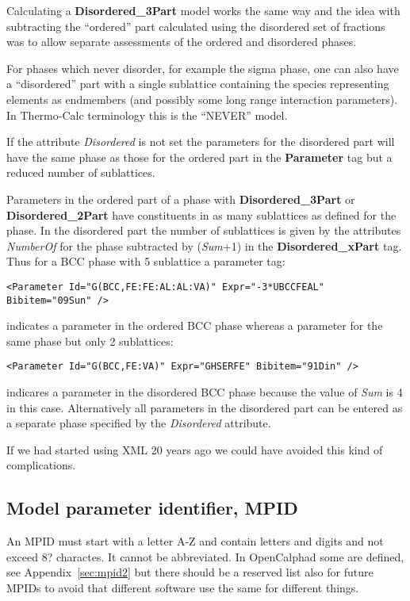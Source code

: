 \documentclass{article}
\begin{document}
Calculating a {\bf Disordered\_3Part} model works the same way and the
idea with subtracting the ``ordered'' part calculated using the
disordered set of fractions was to allow separate assessments of the
ordered and disordered phases.

For phases which never disorder, for example the sigma phase, one can
also have a ``disordered'' part with a single sublattice containing
the species representing elements as endmembers (and possibly some
long range interaction parameters).  In Thermo-Calc terminology this
is the ``NEVER'' model.

If the attribute {\em Disordered} is not set the parameters for the
disordered part will have the same phase as those for the ordered part
in the {\bf Parameter} tag but a reduced number of sublattices.

Parameters in the ordered part of a phase with {\bf Disordered\_3Part}
or {\bf Disordered\_2Part} have constituents in as many sublattices as
defined for the phase.  In the disordered part the number of
sublattices is given by the attributes {\em NumberOf} for the phase
subtracted by ({\em Sum}+1) in the {\bf Disordered\_xPart} tag.  Thus for
a BCC phase with 5 sublattice a parameter tag:
\begin{verbatim}
<Parameter Id="G(BCC,FE:FE:AL:AL:VA)" Expr="-3*UBCCFEAL" Bibitem="09Sun" />
\end{verbatim}
indicates a parameter in the ordered BCC phase
whereas a parameter for the same phase but only 2 sublattices:
\begin{verbatim}
<Parameter Id="G(BCC,FE:VA)" Expr="GHSERFE" Bibitem="91Din" />
\end{verbatim}
indicares a parameter in the disordered BCC phase because the value of
{\em Sum} is 4 in this case.  Alternatively all parameters in the
disordered part can be entered as a separate phase specified by the
{\em Disordered} attribute.

If we had started using XML 20 years ago we could have avoided this
kind of complications.

\subsection{Model parameter identifier, MPID}\label{sec:mpid}

An MPID must start with a letter A-Z and contain letters and digits
and not exceed 8? charactes.  It cannot be abbreviated.  In
OpenCalphad some are defined, see Appendix~\ref{sec:mpid2} but there
should be a reserved list also for future MPIDs to avoid that
different software use the same for different things.
  
\end{document}
